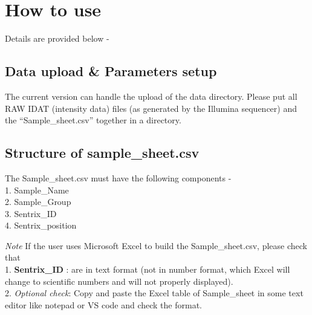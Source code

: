 \documentclass[
  a4paper,
  DIV=11,
  numbers=noendperiod,
  oneside,
  open=any]{scrreport}
\begin{document}
\section{How to use}\label{how-to-use-1}

Details are provided below -

\subsection{Data upload \& Parameters
setup}\label{data-upload-parameters-setup}

The current version can handle the upload of the data directory. Please
put all RAW IDAT (intensity data) files (as generated by the Illumina
sequencer) and the ``Sample\_sheet.csv'' together in a directory.

\subsection{Structure of
sample\_sheet.csv}\label{structure-of-sample_sheet.csv}

The Sample\_sheet.csv must have the following components -\\
1. Sample\_Name\\
2. Sample\_Group\\
3. Sentrix\_ID\\
4. Sentrix\_position

\begin{tcolorbox}[enhanced jigsaw, breakable, colback=white, colbacktitle=quarto-callout-warning-color!10!white, opacityback=0, left=2mm, bottomrule=.15mm, opacitybacktitle=0.6, coltitle=black, bottomtitle=1mm, toprule=.15mm, toptitle=1mm, arc=.35mm, titlerule=0mm, rightrule=.15mm, title=\textcolor{quarto-callout-warning-color}{\faExclamationTriangle}\hspace{0.5em}{Warning}, colframe=quarto-callout-warning-color-frame, leftrule=.75mm]

\emph{Note} If the user uses Microsoft Excel to build the
Sample\_sheet.csv, please check that\\
1. \textbf{Sentrix\_ID} : are in text format (not in number format,
which Excel will change to scientific numbers and will not properly
displayed).\\
2. \emph{Optional check}: Copy and paste the Excel table of
Sample\_sheet in some text editor like notepad or VS code and check the
format.

\end{tcolorbox}
\end{document}
